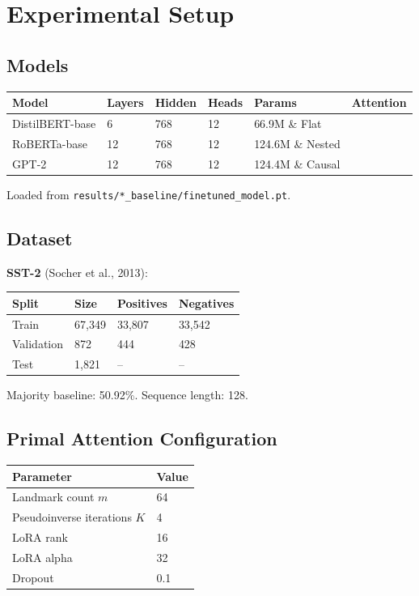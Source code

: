 
\section{Experimental Setup}

\subsection{Models}

\begin{table}[H]
\centering
\small
\begin{tabular}{llllll}
\toprule
\textbf{Model} & \textbf{Layers} & \textbf{Hidden} & \textbf{Heads} & \textbf{Params} & \textbf{Attention} \\
\midrule
DistilBERT-base & 6 & 768 & 12 & 66.9M \& Flat \\
RoBERTa-base & 12 & 768 & 12 & 124.6M \& Nested \\
GPT-2 & 12 & 768 & 12 & 124.4M \& Causal \\
\bottomrule
\end{tabular}
\end{table}

Loaded from \texttt{results/*\_baseline/finetuned\_model.pt}.

\subsection{Dataset}

\textbf{SST-2} (Socher et al., 2013):

\begin{table}[H]
\centering
\small
\begin{tabular}{llll}
\toprule
\textbf{Split} & \textbf{Size} & \textbf{Positives} & \textbf{Negatives} \\
\midrule
Train & 67,349 & 33,807 & 33,542 \\
Validation & 872 & 444 & 428 \\
Test & 1,821 & -- & -- \\
\bottomrule
\end{tabular}
\end{table}

Majority baseline: 50.92\%. Sequence length: 128.

\subsection{Primal Attention Configuration}

\begin{table}[H]
\centering
\small
\begin{tabular}{ll}
\toprule
\textbf{Parameter} & \textbf{Value} \\
\midrule
Landmark count $m$ & 64 \\
Pseudoinverse iterations $K$ & 4 \\
LoRA rank & 16 \\
LoRA alpha & 32 \\
Dropout & 0.1 \\
\bottomrule
\end{tabular}
\end{table}


